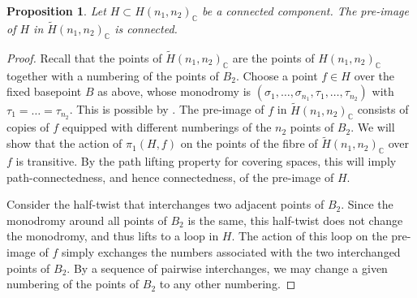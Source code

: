 \documentclass{amsart}
\numberwithin{equation}{section} \numberwithin{figure}{section}
\newcommand\CC{\mathbb{C}}
\theoremstyle{one}
\newtheorem{proposition}[theorem]{\textbf{Proposition}}
\theoremstyle{definition}
\begin{document}
\begin{proposition}\label{prop:comp-Htilde}
  Let \(H \subset H(n_1,n_2)_{\CC}\) be a connected component.
  The pre-image of \(H\) in \(\widetilde H(n_1,n_2)_{\CC}\) is connected.
\end{proposition}
\begin{proof}
  Recall that the points of \(\widetilde H(n_1,n_2)_{\CC}\) are the points of \(H(n_1,n_2)_{\CC}\) together with a numbering of the points of \(B_2\).
  Choose a point \(f \in H\) over the fixed basepoint \(B\) as above, whose monodromy is \((\sigma_1, \dots, \sigma_{n_1}, \tau_1, \dots, \tau_{n_2})\) with \(\tau_1 = \dots = \tau_{n_2}\).
  This is possible by .
  The pre-image of \(f\) in \(\widetilde H(n_1,n_2)_{\CC}\) consists of copies of $f$ 
  equipped with different numberings of the \(n_2\) points of \(B_2\).
  We will show that the action of \(\pi_1(H, f)\) on the points of the fibre of \(\widetilde H(n_1,n_2)_{\CC}\) over \(f\) is transitive.
  By the path lifting property for covering spaces, this will imply path-connectedness, and hence connectedness, of the pre-image of $H$.

  
  Consider the half-twist that interchanges two adjacent points of \(B_2\).
  Since the monodromy around all points of \(B_2\) is the same, this half-twist does not change the monodromy, and thus lifts to a loop in \(H\).
  The action of this loop on the pre-image of $f$ simply exchanges the numbers associated with the two interchanged points of \(B_2\).
  By a sequence of pairwise interchanges, we may change a given numbering of the points of \(B_2\) to any other numbering.
\end{proof}
\end{document}
